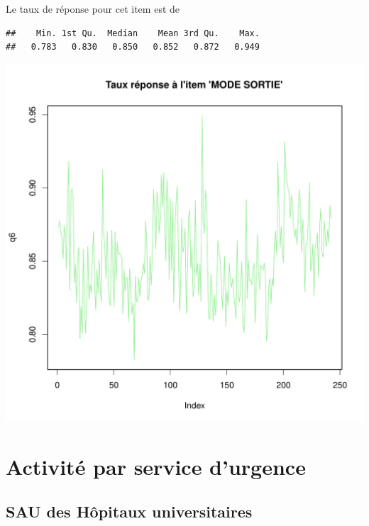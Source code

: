 \documentclass[12pt,english,french,twoside]{report}\usepackage[]{graphicx}\usepackage[]{color}
\makeatletter
\def\maxwidth{ %
  \ifdim\Gin@nat@width>\linewidth
    \linewidth
  \else
    \Gin@nat@width
  \fi
}
\newenvironment{kframe}{%
 \def\at@end@of@kframe{}%
 \ifinner\ifhmode%
  \def\at@end@of@kframe{\end{minipage}}%
  \begin{minipage}{\columnwidth}%
 \fi\fi%
 \def\FrameCommand##1{\hskip\@totalleftmargin \hskip-\fboxsep
 \colorbox{shadecolor}{##1}\hskip-\fboxsep
     \hskip-\linewidth \hskip-\@totalleftmargin \hskip\columnwidth}%
 \MakeFramed {\advance\hsize-\width
   \@totalleftmargin\z@ \linewidth\hsize
   \@setminipage}}%
 {\par\unskip\endMakeFramed%
 \at@end@of@kframe}
\newenvironment{knitrout}{}{} %
\makeatother
\begin{document}
Le taux de réponse pour cet item est de
\begin{knitrout}
\color{fgcolor}\begin{kframe}
\begin{verbatim}
##    Min. 1st Qu.  Median    Mean 3rd Qu.    Max. 
##   0.783   0.830   0.850   0.852   0.872   0.949
\end{verbatim}
\end{kframe}
\includegraphics[width=\maxwidth]{figure/retour_dom3} 

\end{knitrout}




\part{Activité par service d'urgence}

\chapter{SAU des Hôpitaux universitaires}
\end{document}
